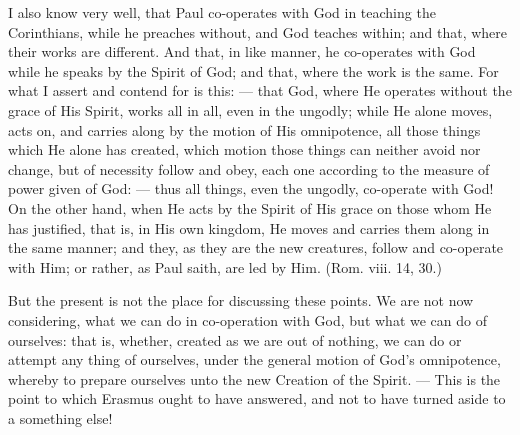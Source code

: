I also know very well, that Paul co-operates with God in teaching the Corinthians, while he preaches without, and God teaches within; and that, where their works are different. And that, in like manner, he co-operates with God while he speaks by the Spirit of God; and that, where the work is the same. For what I assert and contend for is this: — that God, where He operates without the grace of His Spirit, works all in all, even in the ungodly; while He alone moves, acts on, and carries along by the motion of His omnipotence, all those things which He alone has created, which motion those things can neither avoid nor change, but of necessity follow and obey, each one according to the measure of power given of God: — thus all things, even the ungodly, co-operate with God! On the other hand, when He acts by the Spirit of His grace on those whom He has justified, that is, in His own kingdom, He moves and carries them along in the same manner; and they, as they are the new creatures, follow and co-operate with Him; or rather, as Paul saith, are led by Him. (Rom. viii. 14, 30.)

But the present is not the place for discussing these points. We are not now considering, what we can do in co-operation with God, but what we can do of ourselves: that is, whether, created as we are out of nothing, we can do or attempt any thing of ourselves, under the general motion of God’s omnipotence, whereby to prepare ourselves unto the new Creation of the Spirit. — This is the point to which Erasmus ought to have answered, and not to have turned aside to a something else!

